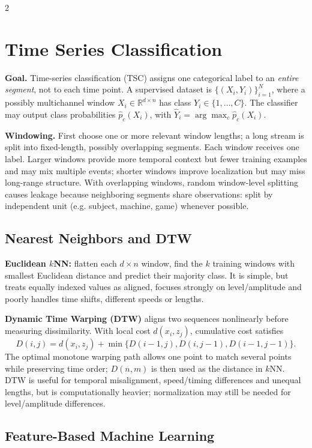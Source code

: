 \documentclass[9pt,a4paper]{extarticle}
\newcommand{\key}[1]{\textbf{#1}}
\begin{document}
\begin{multicols}{2}
\section{Time Series Classification}

\key{Goal.} Time-series classification (TSC) assigns one categorical label to an \emph{entire segment}, not to each time point. A supervised dataset is \(\{(X_i,Y_i)\}_{i=1}^N\), where a possibly multichannel window \(X_i\in\mathbb R^{d\times n}\) has class \(Y_i\in\{1,\ldots,C\}\). The classifier may output class probabilities \(\widehat p_c(X_i)\), with \(\widehat Y_i=\arg\max_c\widehat p_c(X_i)\).

\key{Windowing.} First choose one or more relevant window lengths; a long stream is split into fixed-length, possibly overlapping segments. Each window receives one label. Larger windows provide more temporal context but fewer training examples and may mix multiple events; shorter windows improve localization but may miss long-range structure. With overlapping windows, random window-level splitting causes leakage because neighboring segments share observations: split by independent unit (e.g. subject, machine, game) whenever possible.

\subsection{Nearest Neighbors and DTW}

\key{Euclidean \(k\)NN:} flatten each \(d\times n\) window, find the \(k\) training windows with smallest Euclidean distance and predict their majority class. It is simple, but treats equally indexed values as aligned, focuses strongly on level/amplitude and poorly handles time shifts, different speeds or lengths.

\key{Dynamic Time Warping (DTW)} aligns two sequences nonlinearly before measuring dissimilarity. With local cost \(d(x_i,z_j)\), cumulative cost satisfies
\[
\boxed{D(i,j)=d(x_i,z_j)+\min\{D(i-1,j),D(i,j-1),D(i-1,j-1)\}.}
\]
The optimal monotone warping path allows one point to match several points while preserving time order; \(D(n,m)\) is then used as the distance in \(k\)NN. DTW is useful for temporal misalignment, speed/timing differences and unequal lengths, but is computationally heavier; normalization may still be needed for level/amplitude differences.

\subsection{Feature-Based Machine Learning}


\end{multicols}
\end{document}
